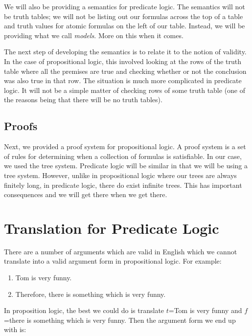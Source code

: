 \documentclass[
]{book}
\providecommand{\tightlist}{%
  \setlength{\itemsep}{0pt}\setlength{\parskip}{0pt}}
\begin{document}
We will also be providing a semantics for predicate logic. The semantics will not be truth tables; we will not be listing out our formulas across the top of a table and truth values for atomic formulas on the left of our table. Instead, we will be providing what we call \emph{models}. More on this when it comes.

The next step of developing the semantics is to relate it to the notion of validity. In the case of propositional logic, this involved looking at the rows of the truth table where all the premises are true and checking whether or not the conclusion was also true in that row. The situation is much more complicated in predicate logic. It will not be a simple matter of checking rows of some truth table (one of the reasons being that there will be no truth tables).

\hypertarget{proofs}{%
\section{Proofs}\label{proofs}}

Next, we provided a proof system for propositional logic. A proof system is a set of rules for determining when a collection of formulas is satisfiable. In our case, we used the tree system. Predicate logic will be similar in that we will be using a tree system. However, unlike in propositional logic where our trees are always finitely long, in predicate logic, there do exist infinite trees. This has important consequences and we will get there when we get there.

\hypertarget{translation-for-predicate-logic}{%
\chapter{Translation for Predicate Logic}\label{translation-for-predicate-logic}}

There are a number of arguments which are valid in English which we cannot translate into a valid argument form in propositional logic. For example:

\begin{enumerate}
\def\labelenumi{\arabic{enumi}.}
\tightlist
\item
  Tom is very funny.
\item
  Therefore, there is something which is very funny.
\end{enumerate}

In proposition logic, the best we could do is translate \(t\)=Tom is very funny and \(f\)=there is something which is very funny. Then the argument form we end up with is:
\end{document}

